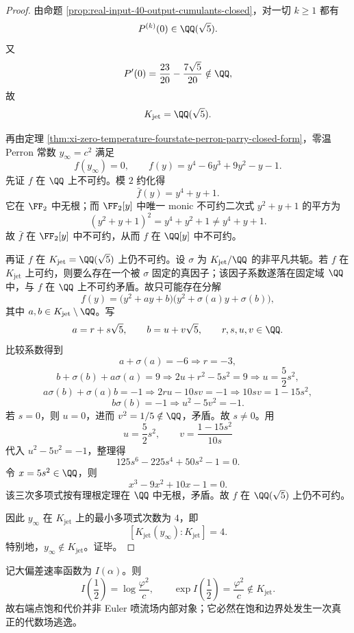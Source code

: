 \begin{proof}
由命题 \ref{prop:real-input-40-output-cumulants-closed}，对一切 \(k\ge 1\) 都有
\[
P^{(k)}(0)\in\QQ(\sqrt5).
\]
又
\[
P'(0)=\frac{23}{20}-\frac{7\sqrt5}{20}\notin \QQ,
\]
故
\[
K_{\mathrm{jet}}=\QQ(\sqrt5).
\]

再由定理 \ref{thm:xi-zero-temperature-fourstate-perron-parry-closed-form}，零温 Perron 常数 \(y_\infty=c^2\) 满足
\[
f(y_\infty)=0,
\qquad
f(y)=y^4-6y^3+9y^2-y-1.
\]
先证 \(f\) 在 \(\QQ\) 上不可约。模 \(2\) 约化得
\[
\bar f(y)=y^4+y+1.
\]
它在 \(\FF_2\) 中无根；而 \(\FF_2[y]\) 中唯一 monic 不可约二次式 \(y^2+y+1\) 的平方为
\[
(y^2+y+1)^2=y^4+y^2+1\neq y^4+y+1.
\]
故 \(\bar f\) 在 \(\FF_2[y]\) 中不可约，从而 \(f\) 在 \(\QQ[y]\) 中不可约。

再证 \(f\) 在 \(K_{\mathrm{jet}}=\QQ(\sqrt5)\) 上仍不可约。设 \(\sigma\) 为 \(K_{\mathrm{jet}}/\QQ\) 的非平凡共轭。若 \(f\) 在 \(K_{\mathrm{jet}}\) 上可约，则要么存在一个被 \(\sigma\) 固定的真因子；该因子系数遂落在固定域 \(\QQ\) 中，与 \(f\) 在 \(\QQ\) 上不可约矛盾。故只可能存在分解
\[
f(y)=\bigl(y^2+ay+b\bigr)\bigl(y^2+\sigma(a)y+\sigma(b)\bigr),
\]
其中 \(a,b\in K_{\mathrm{jet}}\setminus\QQ\)。写
\[
a=r+s\sqrt5,\qquad b=u+v\sqrt5,
\qquad r,s,u,v\in\QQ.
\]
比较系数得到
\[
a+\sigma(a)=-6 \Rightarrow r=-3,
\]
\[
b+\sigma(b)+a\sigma(a)=9
\Rightarrow 2u+r^2-5s^2=9
\Rightarrow u=\frac52 s^2,
\]
\[
a\sigma(b)+\sigma(a)b=-1
\Rightarrow 2ru-10sv=-1
\Rightarrow 10sv=1-15s^2,
\]
\[
b\sigma(b)=-1
\Rightarrow u^2-5v^2=-1.
\]
若 \(s=0\)，则 \(u=0\)，进而 \(v^2=1/5\notin\QQ\)，矛盾。故 \(s\neq0\)。用
\[
u=\frac52 s^2,
\qquad
v=\frac{1-15s^2}{10s}
\]
代入 \(u^2-5v^2=-1\)，整理得
\[
125s^6-225s^4+50s^2-1=0.
\]
令 \(x=5s^2\in\QQ\)，则
\[
x^3-9x^2+10x-1=0.
\]
该三次多项式按有理根定理在 \(\QQ\) 中无根，矛盾。故 \(f\) 在 \(\QQ(\sqrt5)\) 上仍不可约。

因此 \(y_\infty\) 在 \(K_{\mathrm{jet}}\) 上的最小多项式次数为 \(4\)，即
\[
[K_{\mathrm{jet}}(y_\infty):K_{\mathrm{jet}}]=4.
\]
特别地，\(y_\infty\notin K_{\mathrm{jet}}\)。证毕。
\end{proof}

\begin{corollary}[饱和端点代价的场逃逸]\label{cor:conclusion-realinput40-saturation-cost-field-escape}
记大偏差速率函数为 \(I(\alpha)\)。则
\[
I\!\left(\frac12\right)=\log\frac{\varphi^2}{c},
\qquad
\exp I\!\left(\frac12\right)=\frac{\varphi^2}{c}\notin K_{\mathrm{jet}}.
\]
故右端点饱和代价并非 Euler 喷流场内部对象；它必然在饱和边界处发生一次真正的代数场逃逸。
\end{corollary}

